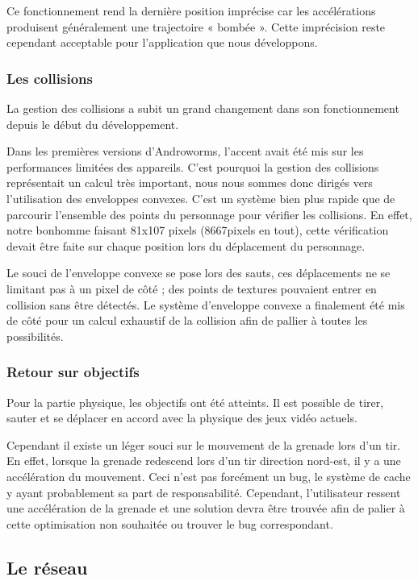 \documentclass{report}
\begin{document}
Ce fonctionnement rend la dernière position imprécise car les 
accélérations produisent généralement une trajectoire « bombée ». Cette 
imprécision reste cependant acceptable pour l’application que nous 
développons.

\subsubsection{Les collisions}
La gestion des collisions a subit un grand changement dans son 
fonctionnement depuis le début du développement.

Dans les premières versions d’Androworms, l’accent avait été mis sur les
performances limitées des appareils. C’est pourquoi la gestion des
collisions représentait un calcul très important, nous nous sommes donc
dirigés vers l’utilisation des enveloppes convexes. C’est un système
bien plus rapide que de parcourir l’ensemble des points du personnage
pour vérifier les collisions. En effet, notre bonhomme faisant 81x107
pixels (8667pixels en tout), cette vérification devait être faite sur
chaque position lors du déplacement du personnage. 

Le souci de l’enveloppe convexe se pose lors des sauts, ces déplacements
ne se limitant pas à un pixel de côté ; des points de textures pouvaient
entrer en collision sans être détectés. 
Le système d’enveloppe convexe a finalement été mis de côté pour un
calcul exhaustif de la collision afin de pallier à toutes les
possibilités.

\subsubsection{Retour sur objectifs}

Pour la partie physique, les objectifs ont été atteints. Il est possible
de tirer, sauter et se déplacer en accord avec la physique des jeux
vidéo actuels. 

Cependant il existe un léger souci sur le mouvement de la grenade lors
d’un tir. En effet, lorsque la grenade redescend lors d’un tir direction
nord-est, il y a une accélération du mouvement. Ceci n’est pas forcément
un bug, le système de cache y ayant probablement sa part de
responsabilité. Cependant, l’utilisateur ressent une accélération de la
grenade et une solution devra être trouvée afin de palier à cette
optimisation non souhaitée ou trouver le bug correspondant.


\subsection{Le réseau}
\bigskip
\end{document}

